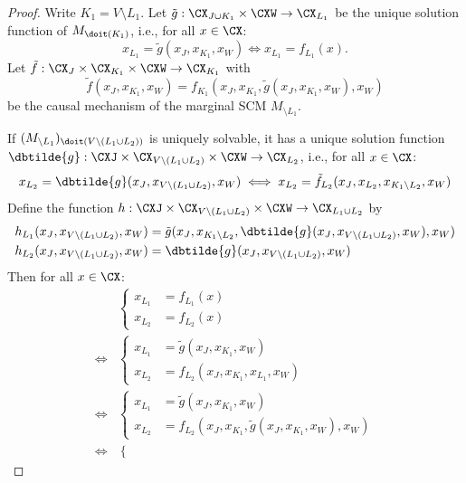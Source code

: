 \begin{proof}
  Write $K_1 = V \setminus L_1$.
  Let $\tilde{g} : \CX_{J\cup K_1} \times \CXW \to \CX_{L_1}$ be the unique solution function of $M_{\doit(K_1)}$,
  i.e., for all $x \in \CX$:
  $$x_{L_1} = \tilde{g}(x_J,x_{K_1},x_W) \iff x_{L_1} = f_{L_1}(x).$$
  Let $\tilde{f} : \CX_J \times \CX_{K_1} \times \CXW \to \CX_{K_1}$ with
  $$\tilde{f}(x_J,x_{K_1},x_W) = f_{K_1}(x_J,x_{K_1},\tilde{g}(x_J,x_{K_1},x_W),x_W)$$
  be the causal mechanism of the marginal SCM $M_{\setminus L_1}$.

  If $(M_{\setminus L_1})_{\doit(V\setminus(L_1\cup L_2))}$ is uniquely solvable, it has a unique solution function
  $\dbtilde{g} : \CXJ \times \CX_{V\setminus (L_1\cup L_2)} \times \CXW \to \CX_{L_2}$, i.e., for all $x \in \CX$:
  $$x_{L_2} = \dbtilde{g}(x_J,x_{V\setminus(L_1\cup L_2)},x_W) \iff x_{L_2} = \tilde{f}_{L_2}(x_J,x_{L_2},x_{K_1\setminus L_2},x_W)$$
  Define the function $h : \CXJ \times \CX_{V\setminus(L_1\cup L_2)} \times \CXW \to \CX_{L_1 \cup L_2}$ by
  \begin{align*}
    h_{L_1}(x_J,x_{V\setminus(L_1\cup L_2)},x_W) &= \tilde{g}(x_J,x_{K_1\setminus L_2},\dbtilde{g}(x_J,x_{V\setminus(L_1 \cup L_2)},x_W),x_W) \\
    h_{L_2}(x_J,x_{V\setminus(L_1\cup L_2)},x_W) &= \dbtilde{g}(x_J,x_{V\setminus(L_1 \cup L_2)},x_W)
  \end{align*}
  Then for all $x \in \CX$:
  \begin{equation*}\begin{split}
    & \begin{cases}
      x_{L_1} &= f_{L_1}(x) \\
      x_{L_2} &= f_{L_2}(x) 
    \end{cases} \\
    \iff &
    \begin{cases}
      x_{L_1} &= \tilde{g}(x_J,x_{K_1},x_W) \\
      x_{L_2} &= f_{L_2}(x_J,x_{K_1},x_{L_1},x_W) 
    \end{cases} \\
    \iff &
    \begin{cases}
      x_{L_1} &= \tilde{g}(x_J,x_{K_1},x_W) \\
      x_{L_2} &= f_{L_2}(x_J,x_{K_1},\tilde{g}(x_J,x_{K_1},x_W),x_W) 
    \end{cases} \\
    \iff &
    \begin{cases}

\end{cases}
\end{split}
\end{equation*}
\end{proof}
